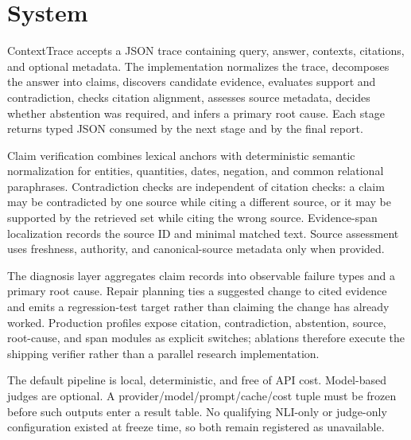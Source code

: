 \section{System}
ContextTrace accepts a JSON trace containing query, answer, contexts, citations,
and optional metadata. The implementation normalizes the trace, decomposes the
answer into claims, discovers candidate evidence, evaluates support and
contradiction, checks citation alignment, assesses source metadata, decides
whether abstention was required, and infers a primary root cause. Each stage
returns typed JSON consumed by the next stage and by the final report.

Claim verification combines lexical anchors with deterministic semantic
normalization for entities, quantities, dates, negation, and common relational
paraphrases. Contradiction checks are independent of citation checks: a claim
may be contradicted by one source while citing a different source, or it may be
supported by the retrieved set while citing the wrong source. Evidence-span
localization records the source ID and minimal matched text. Source assessment
uses freshness, authority, and canonical-source metadata only when provided.

The diagnosis layer aggregates claim records into observable failure types and
a primary root cause. Repair planning ties a suggested change to cited evidence
and emits a regression-test target rather than claiming the change has already
worked. Production profiles expose citation, contradiction, abstention, source,
root-cause, and span modules as explicit switches; ablations therefore execute
the shipping verifier rather than a parallel research implementation.

The default pipeline is local, deterministic, and free of API cost. Model-based
judges are optional. A provider/model/prompt/cache/cost tuple must be frozen
before such outputs enter a result table. No qualifying NLI-only or judge-only
configuration existed at freeze time, so both remain registered as unavailable.
